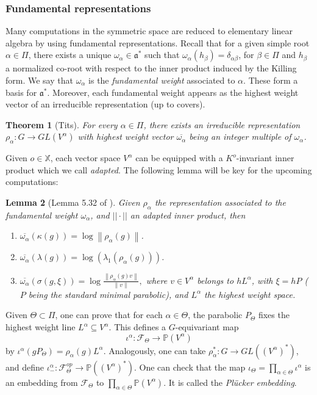 \documentclass{amsart}
\newcommand{\PP}{\mathbb{P}}
\newcommand{\norm}[1]{\left\lVert#1\right\rVert}
\newtheorem{thm}{Theorem}[section]
\newtheorem{lemma}[thm]{Lemma}
\theoremstyle{remark}
\theoremstyle{definition}
\begin{document}
\subsubsection{Fundamental representations}

Many computations in the symmetric space are reduced to elementary linear algebra by using fundamental representations.
Recall that for a given simple root $\alpha \in \Pi$, there exists a unique $\omega_\alpha \in \mathfrak{a}^*$ such that $\omega_\alpha (h_\beta) = \delta_{\alpha \beta}$, for $\beta \in \Pi$ and $h_\beta$ a normalized co-root with respect to the inner product induced by the Killing form.
We say that $\omega_\alpha$ is the \emph{fundamental weight} associated to $\alpha$.
These form a basis for $\mathfrak{a}^*$. 
Moreover, each fundamental weight appears as the highest weight vector of an irreducible representation (up to covers).

\begin{thm}[Tits]
 For every $\alpha \in \Pi$, there exists an irreducible representation $\rho_\alpha : G \to GL (V^\alpha)$ with highest weight vector $\overline{\omega_\alpha}$ being an integer multiple of $\omega_\alpha$.
\end{thm}

Given $o \in \mathbb{X}$, each vector space $V^\alpha$ can be equipped with a $K^o$-invariant inner product which we call \emph{adapted}.
The following lemma will be key for the upcoming computations:


\begin{lemma}[Lemma 5.32 of \cite{benoist2016random}]
\label{lemma:fundamentalrep}
 Given $\rho_\alpha$ the representation associated to the fundamental weight $\omega_\alpha$, and $||\cdot ||$ an adapted inner product, then
    \begin{enumerate}
        \item $\overline{\omega_\alpha} (\kappa (g)) = \log \norm{\rho_\alpha (g)}$.
        \item $\overline{\omega_\alpha} (\lambda (g)) = \log (\lambda_1 (\rho_\alpha (g)))$.
        \item $\overline{\omega_\alpha} (\sigma (g, \xi)) = \log \frac{\norm{ \rho_\alpha (g) v}}{\norm{v}},$ where $v \in V^\alpha$ belongs to $h L^\alpha$, with $\xi = hP$ ($P$ being the standard minimal parabolic), and $L^\alpha$ the highest weight space. 
    \end{enumerate}
\end{lemma}

Given $\Theta \subset \Pi$, one can prove that for each $\alpha \in \Theta$, the parabolic $P_\Theta$ fixes the highest weight line $L^\alpha \subseteq V^\alpha$. 
This defines a $G$-equivariant map
$$\iota^\alpha: \mathcal{F}_\Theta \to \PP(V^\alpha)$$
by $\iota^\alpha(gP_\Theta) = \rho_\alpha(g)L^\alpha$.
Analogously, one can take $\rho_\alpha^*: G \to GL((V^\alpha)^*)$, and define $\iota^{\alpha}_-: \mathcal{F}^{op}_\Theta \to \PP((V^\alpha)^*)$.  
One can check that the map $\iota_\Theta =  \prod_{\alpha \in  \Theta} \iota^\alpha$ is an embedding from $\mathcal{F}_\Theta$ to $\prod_{\alpha \in \Theta}\PP(V^\alpha)$. 
It is called the \emph{Plücker embedding}. 
\end{document}
